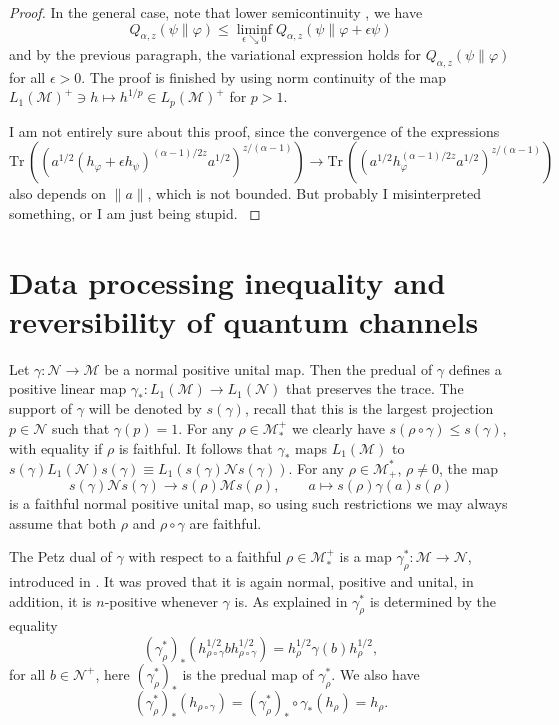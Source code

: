 \documentclass[12pt]{article}
\theoremstyle{definition}
\theoremstyle{remark}
\def\Me{\mathcal M}
\def\Ne{\mathcal N}
\def \Tr{\mathrm{Tr}\,}
\begin{document}
\begin{proof}
In the general case, note that lower semicontinuity \cite[]{kato2023onrenyi}, we have
\[
Q_{\alpha,z}(\psi\|\varphi)\le \liminf_{\epsilon\searrow 0}
Q_{\alpha,z}(\psi\|\varphi+\epsilon \psi) 
\]
and by the previous paragraph, the variational expression holds for
$Q_{\alpha,z}(\psi\|\varphi)$  for all $\epsilon>0$. The proof is finished 
by using norm continuity of the map $L_1(\Me)^+\ni h\mapsto h^{1/p}\in L_p(\Me)^+$ for
$p>1$. 
 

 {\color{red} I am not entirely sure about this proof, since the convergence of the
 expressions 
\[
 \Tr\left((a^{1/2}(h_\varphi+\epsilon
 h_\psi)^{(\alpha-1)/2z}a^{1/2})^{z/(\alpha-1)}\right)\to
 \Tr\left((a^{1/2}h_\varphi^{(\alpha-1)/2z}a^{1/2})^{z/(\alpha-1)}\right)\]
 also depends
 on $\|a\|$, which is not bounded. But probably I misinterpreted something, or I am just being
 stupid. }
 
\end{proof}

\section{Data processing inequality and reversibility of quantum channels}

Let  $\gamma: \Ne\to \Me$ be a normal positive unital map. Then the  predual of $\gamma$  defines a 
positive linear map $\gamma_*: L_1(\Me)\to L_1(\Ne)$ that preserves the trace. The support
of $\gamma$ will be denoted by $s(\gamma)$, recall that this is the largest projection
$p\in \Ne$ such that $\gamma(p)=1$. For any $\rho\in \Me_*^+$ we clearly have
$s(\rho\circ\gamma)\le s(\gamma)$, with equality if $\rho$ is faithful. 
It follows that $\gamma_*$ maps $L_1(\Me)$ to $s(\gamma)L_1(\Ne)s(\gamma)\equiv
L_1(s(\gamma)\Ne s(\gamma))$.  For any $\rho\in \Me_+^*$, $\rho\ne 0$, the map
\[
s(\gamma)\Ne s(\gamma)\to s(\rho)\Me s(\rho),\qquad a\mapsto s(\rho) \gamma(a)s(\rho)
\]
is a faithful normal positive unital map, so using such  restrictions we may always assume that both $\rho$ and $\rho\circ
\gamma$ are faithful.

The Petz dual  of $\gamma$ with respect to a faithful  $\rho\in \Me_*^+$
is a map $\gamma_\rho^*:\Me\to \Ne$,
introduced in \cite{petz...,petz1988sufficiency}. It was proved that it is again
normal, positive and unital, in addition, it is $n$-positive whenever $\gamma$ is. 
As explained in \cite{jencova2018renyi} $\gamma^*_\rho$ is determined by the equality
\begin{equation}\label{eq:petzdual}
(\gamma^*_\rho)_*(h_{\rho\circ\gamma}^{1/2}bh_{\rho\circ\gamma}^{1/2})=h_\rho^{1/2}\gamma(b)h_\rho^{1/2},
\end{equation}
for all $b\in \Ne^+$, here $(\gamma^*_\rho)_*$ is the predual map of $\gamma^*_\rho$. We
also have
\[
(\gamma^*_\rho)_*(h_{\rho\circ\gamma})=(\gamma^*_\rho)_*\circ \gamma_*(h_\rho)=h_\rho.
\]
\end{document}
